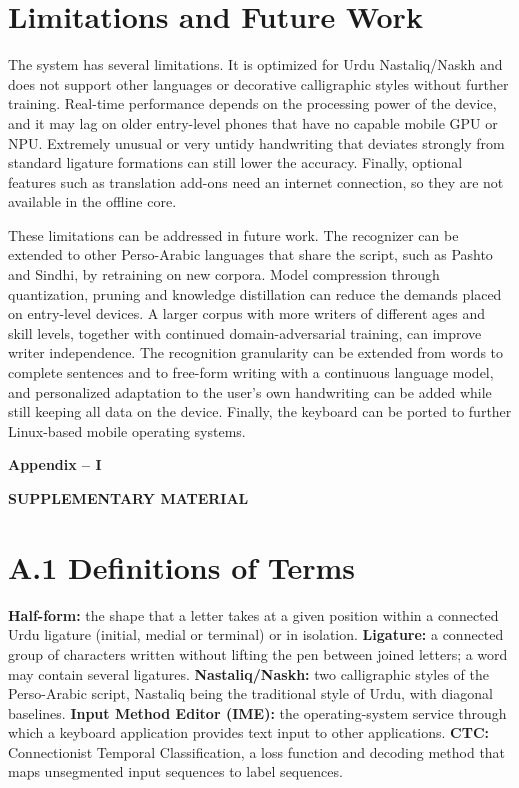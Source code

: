 \documentclass[12pt,a4paper]{report}
\newcommand{\fypspecial}[3]{%
  \clearpage\phantomsection
  \addcontentsline{toc}{chapter}{#3}%
  \thispagestyle{empty}%
  \vspace*{\fill}%
  \begin{center}
    {\bfseries\fontsize{18}{22}\selectfont #1\par}
    \vspace{14pt}
    {\bfseries\fontsize{22}{26}\selectfont #2\par}
  \end{center}
  \vspace*{\fill}%
  \clearpage}
\begin{document}
\section{Limitations and Future Work}
The system has several limitations. It is optimized for Urdu Nastaliq/Naskh and does not support other languages or decorative calligraphic styles without further training. Real-time performance depends on the processing power of the device, and it may lag on older entry-level phones that have no capable mobile GPU or NPU. Extremely unusual or very untidy handwriting that deviates strongly from standard ligature formations can still lower the accuracy. Finally, optional features such as translation add-ons need an internet connection, so they are not available in the offline core.

These limitations can be addressed in future work. The recognizer can be extended to other Perso-Arabic languages that share the script, such as Pashto and Sindhi, by retraining on new corpora. Model compression through quantization, pruning and knowledge distillation can reduce the demands placed on entry-level devices. A larger corpus with more writers of different ages and skill levels, together with continued domain-adversarial training, can improve writer independence. The recognition granularity can be extended from words to complete sentences and to free-form writing with a continuous language model, and personalized adaptation to the user's own handwriting can be added while still keeping all data on the device. Finally, the keyboard can be ported to further Linux-based mobile operating systems.

\fypspecial{Appendix -- I}{SUPPLEMENTARY MATERIAL}{APPENDIX -- I}

\section*{A.1 Definitions of Terms}
\noindent\textbf{Half-form:} the shape that a letter takes at a given position within a connected Urdu ligature (initial, medial or terminal) or in isolation. \textbf{Ligature:} a connected group of characters written without lifting the pen between joined letters; a word may contain several ligatures. \textbf{Nastaliq/Naskh:} two calligraphic styles of the Perso-Arabic script, Nastaliq being the traditional style of Urdu, with diagonal baselines. \textbf{Input Method Editor (IME):} the operating-system service through which a keyboard application provides text input to other applications. \textbf{CTC:} Connectionist Temporal Classification, a loss function and decoding method that maps unsegmented input sequences to label sequences.
\end{document}
